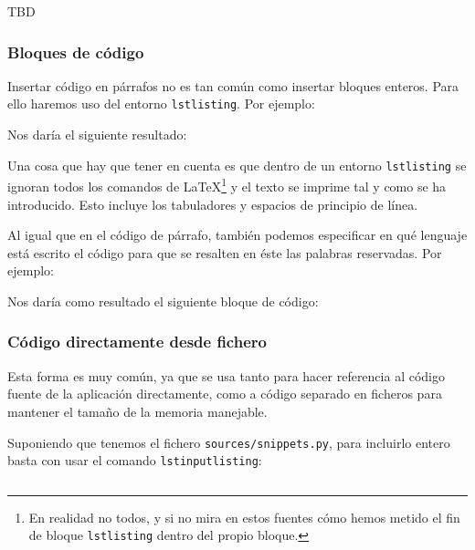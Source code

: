 \documentclass[%
    school=etsisi,%
    type=pfg,%
    degree=61CI,%
]{upm-report}
\begin{document}
TBD

\subsubsection{Bloques de código}

Insertar código en párrafos no es tan común como insertar bloques enteros. Para ello haremos uso del entorno \texttt{lstlisting}. Por ejemplo:



Nos daría el siguiente resultado:



Una cosa que hay que tener en cuenta es que dentro de un entorno \texttt{lstlisting} se ignoran todos los comandos de \LaTeX\space\footnote{En realidad no todos, y si no mira en estos fuentes cómo hemos metido el fin de bloque \texttt{lstlisting} dentro del propio bloque.} y el texto se imprime tal y como se ha introducido. Esto incluye los tabuladores y espacios de principio de línea.

Al igual que en el código de párrafo, también podemos especificar en qué lenguaje está escrito el código para que se resalten en éste las palabras reservadas. Por ejemplo:



Nos daría como resultado el siguiente bloque de código:
 


\subsubsection{Código directamente desde fichero}

Esta forma es muy común, ya que se usa tanto para hacer referencia al código fuente de la aplicación directamente, como a código separado en ficheros para mantener el tamaño de la memoria manejable.

Suponiendo que tenemos el fichero \texttt{sources/snippets.py}, para incluirlo entero basta con usar el comando \texttt{lstinputlisting}:

\begin{lstlisting}[language=TeX]

\end{lstlisting}
\end{document}
